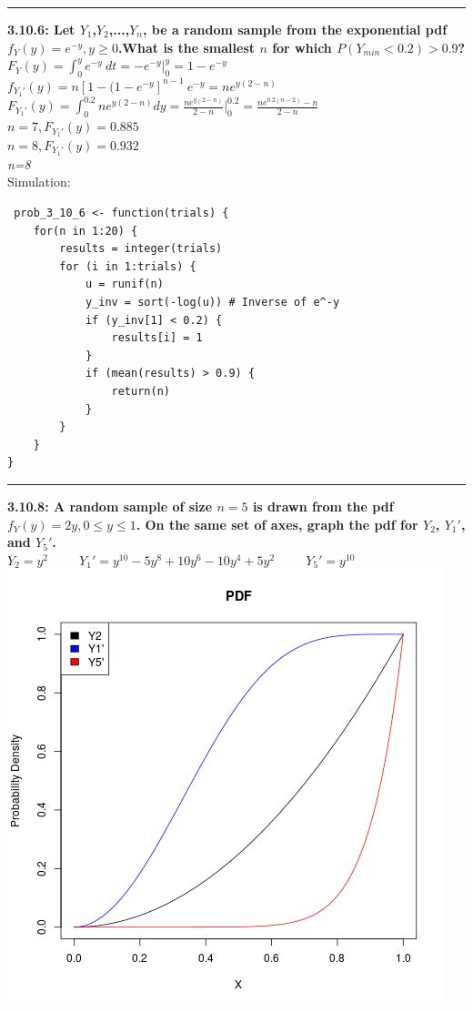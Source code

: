 \documentclass[11pt]{article}
\newcommand\question[2]{\vspace{.25in}\hrule\textbf{#1: #2}\vspace{.5em}\vspace{.10in}}
\begin{document}
\question{3.10.6}
{Let $Y_{1}$,$Y_{2}$,...,$Y_{n}$, be a random sample from the exponential pdf
$f_{Y}(y) = e^{-y},y \geq 0$.What is the smallest $n$ for which
$P(Y_{min} < 0.2) > 0.9$?
}
\\
$
F_{Y}(y) 
=
\int_{0}^{y} e^{-y} \ dt
=
-e^{-y} \big |_{0}^{y}
=
1 -e^{-y}
$
\\
$
f_{Y_{1}'}(y)
=
n[1-(1-e^{-y}]^{n-1} \ e^{-y}
=
ne^{y(2-n)}
$
\\
$
F_{Y_{1}'}(y)
=
\int_{0}^{0.2} ne^{y(2-n)} dy
=
\frac{ne^{y(2-n)}}{2-n} \big |_{0}^{0.2}
=
\frac{ne^{0.2(n-2)} - n}{2-n} 
$
\\
$
n=7,
F_{Y_{1}'}(y)
=
0.885
$
\\
$
n=8,
F_{Y_{1}'}(y)
=
0.932
$
\\
\emph{n=8}
\\
Simulation:
\\
\begin{lstlisting}
 prob_3_10_6 <- function(trials) {
    for(n in 1:20) {
        results = integer(trials)
        for (i in 1:trials) {
            u = runif(n)
            y_inv = sort(-log(u)) # Inverse of e^-y
            if (y_inv[1] < 0.2) {
                results[i] = 1
            }
            if (mean(results) > 0.9) {
                return(n)
            }
        }
    }
}
\end{lstlisting}


\question{3.10.8}
{A random sample of size $n = 5$ is drawn from the pdf
$f_{Y}(y) = 2y, 0 \leq y \leq 1$.
On the same set of axes, graph the pdf for
$Y_{2}$, $Y_{1}'$, and $Y_{5}'$.}
\\
$
Y_{2} = y^{2}
\ \ \ \ \ \ \ \ \ \ \ 
Y_{1}' = y^{10} - 5y^{8} + 10y^{6} - 10y^{4} + 5y^{2}
\ \ \ \ \ \ \ \ \ \ \ 
Y_{5}' = y^{10}
$
\includegraphics[scale=0.5]{rplot}
\end{document}
